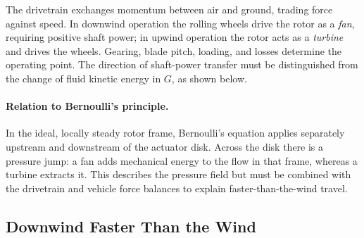 \documentclass[reprint,aps,pra,longbibliography]{revtex4-2}
\begin{document}
The drivetrain exchanges momentum between air and ground, trading force against speed. In downwind operation the rolling wheels drive the rotor as a \emph{fan}, requiring positive shaft power; in upwind operation the rotor acts as a \emph{turbine} and drives the wheels. Gearing, blade pitch, loading, and losses determine the operating point. The direction of shaft-power transfer must be distinguished from the change of fluid kinetic energy in \(G\), as shown below.



\paragraph*{Relation to Bernoulli's principle.}
In the ideal, locally steady rotor frame, Bernoulli's equation applies separately upstream and downstream of the actuator disk. Across the disk there is a pressure jump: a fan adds mechanical energy to the flow in that frame, whereas a turbine extracts it. This describes the pressure field but must be combined with the drivetrain and vehicle force balances to explain faster-than-the-wind travel.


\subsection{Downwind Faster Than the Wind}
\end{document}
